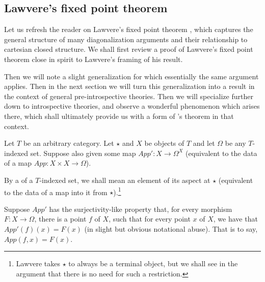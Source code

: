 \subsection{Lawvere's fixed point theorem}
Let us refresh the reader on Lawvere's fixed point theorem \autocite{lawvere1969diagonal}, which captures the general structure of many diagonalization arguments and their relationship to cartesian closed structure. We shall first review a proof of Lawvere's fixed point theorem close in spirit to Lawvere's framing of his result.

Then we will note a slight generalization for which essentially the same argument applies. Then in the next section we will turn this generalization into a result in the context of general pre-introspective theories. Then we will specialize further down to introspective theories, and observe a wonderful  phenomenon which arises there, which shall ultimately provide us with a form of \Loeb's theorem in that context.

\newcommand{\point}{\star}
\newcommand{\App}{App}
\newcommand{\Bipresheaf}{Q_2}
\newcommand{\Unipresheaf}{Q_1}
\newcommand{\surjSource}{\sigma}

\label{LawveresFixedPointTheorem}
Let $T$ be an arbitrary category. Let $\point$ and $X$ be objects of $T$ and let $\Omega$ be any $T$-indexed set. Suppose also given some map $\App' : X \to \Omega^X$ (equivalent to the data of a map $\App : X \times X \to \Omega$).

By a  of a $T$-indexed set, we shall mean an element of its aspect at $\point$ (equivalent to the data of a map into it from $\point$).\footnote{Lawvere takes $\point$ to always be a terminal object, but we shall see in the argument that there is no need for such a restriction.}

Suppose $\App'$ has the surjectivity-like property that, for every morphism $F : X \to \Omega$, there is a point $f$ of $X$, such that for every point $x$ of $X$, we have that $\App'(f)(x) = F(x)$ (in slight but obvious notational abuse). That is to say, $\App(f, x) = F(x)$.

